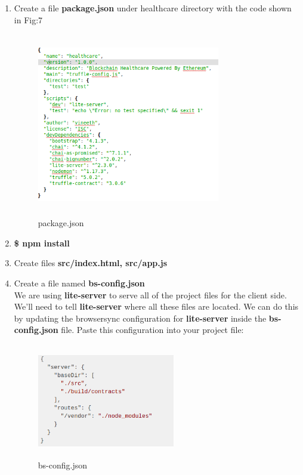 \documentclass[journal,12pt,twocolumn]{IEEEtran}
\begin{document}
\begin{enumerate}

 \item Create a file \textbf{package.json} under healthcare directory with the code shown in Fig:7

  \begin{figure}[H]
  \includegraphics[width=8cm, height=8cm]{package.png}
  \caption{package.json}
  \label{fig:8}
  \end{figure}

 \item \textbf{\$ npm install}

 \item Create files \textbf{src\//index.html, src\//app.js}
 
 \item Create a file named \textbf{bs-config.json}\\
 We are using \textbf{lite-server} to serve all of the project files for the client side. We'll need to tell \textbf{lite-server} where all these files are located. We can do this by updating the browsersync configuration for \textbf{lite-server} inside the \textbf{bs-config.json} file. Paste this configuration into your project file:
 
  \begin{figure}[H]
  \includegraphics[width=6cm, height=5cm]{config.png}
  \caption{bs-config.json}
  \label{fig:9}
  \end{figure}
  

\end{enumerate}
\end{document}
